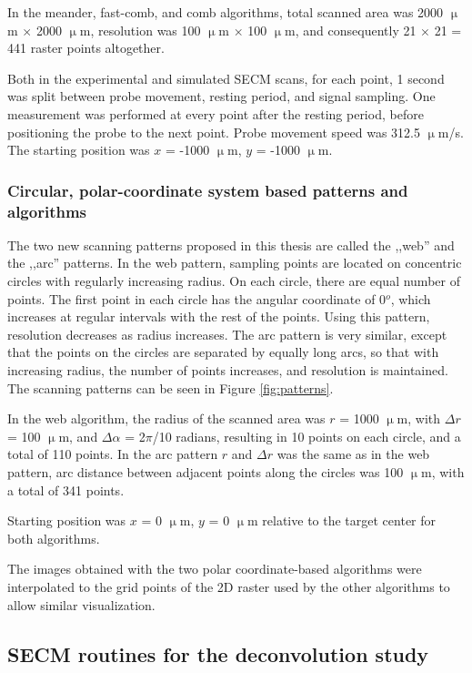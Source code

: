 In the meander, fast-comb, and comb algorithms, total scanned area was 2000 $\upmu$m $\times$ 2000 $\upmu$m, resolution was 100 $\upmu$m $\times$ 100 $\upmu$m, and consequently 21 $\times$ 21 = 441 raster points altogether. 
 
Both in the experimental and simulated SECM scans, for each point, 1 second was split between probe movement, resting period, and signal sampling.
One measurement was performed at every point after the resting period, before positioning the probe to the next point.
Probe movement speed was 312.5 $\upmu$m/s.
The starting position was $x$ = -1000 $\upmu$m, $y$ = -1000 $\upmu$m.

			\subsubsection{Circular, polar-coordinate system based patterns and algorithms}
The two new scanning patterns proposed in this thesis are called the ,,web'' and the ,,arc'' patterns.
In the web pattern, sampling points are located on concentric circles with regularly increasing radius.
On each circle, there are equal number of points.
The first point in each circle has the angular coordinate of 0$^{o}$, which increases at regular intervals with the rest of the points.
Using this pattern, resolution decreases as radius increases.
The arc pattern is very similar, except that the points on the circles are separated by equally long arcs, so that with increasing radius, the number of points increases, and resolution is maintained.
The scanning patterns can be seen in Figure \ref{fig:patterns}.

In the web algorithm, the radius of the scanned area was $r$ = 1000 $\upmu$m, with $\Delta r$ = 100 $\upmu$m, and $\Delta \alpha$ = 2$\pi$/10 radians, resulting in 10 points on each circle, and a total of 110 points.
In the arc pattern $r$ and $\Delta r$ was the same as in the web pattern, arc distance between adjacent points along the circles was 100 $\upmu$m, with a total of 341 points.

Starting position was $x$ = 0 $\upmu$m, $y$ = 0 $\upmu$m relative to the target center for both algorithms.

The images obtained with the two polar coordinate-based algorithms were interpolated to the grid points of the 2D raster used by the other algorithms to allow similar visualization.

	\subsection{SECM routines for the deconvolution study}
